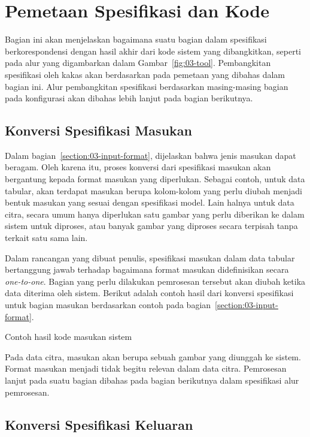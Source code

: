 \section{Pemetaan Spesifikasi dan Kode}

Bagian ini akan menjelaskan bagaimana suatu bagian dalam spesifikasi berkorespondensi dengan hasil akhir dari kode sistem yang dibangkitkan, seperti pada alur yang digambarkan dalam Gambar~\ref{fig:03-tool}.
Pembangkitan spesifikasi oleh kakas akan berdasarkan pada pemetaan yang dibahas dalam bagian ini.
Alur pembangkitan spesifikasi berdasarkan masing-masing bagian pada konfigurasi akan dibahas lebih lanjut pada bagian berikutnya.

\subsection{Konversi Spesifikasi Masukan}

Dalam bagian~\ref{section:03-input-format}, dijelaskan bahwa jenis masukan dapat beragam.
Oleh karena itu, proses konversi dari spesifikasi masukan akan bergantung kepada format masukan yang diperlukan.
Sebagai contoh, untuk data tabular, akan terdapat masukan berupa kolom-kolom yang perlu diubah menjadi bentuk masukan yang sesuai dengan spesifikasi model.
Lain halnya untuk data citra, secara umum hanya diperlukan satu gambar yang perlu diberikan ke dalam sistem untuk diproses, atau banyak gambar yang diproses secara terpisah tanpa terkait satu sama lain.

Dalam rancangan yang dibuat penulis, spesifikasi masukan dalam data tabular bertanggung jawab terhadap bagaimana format masukan didefinisikan secara \textit{one-to-one}.
Bagian yang perlu dilakukan pemrosesan tersebut akan diubah ketika data diterima oleh sistem.
Berikut adalah contoh hasil dari konversi spesifikasi untuk bagian masukan berdasarkan contoh pada bagian~\ref{section:03-input-format}.

\begin{code}
	\caption{Contoh hasil kode masukan sistem}
	\label{listing:10}
\end{code}

Pada data citra, masukan akan berupa sebuah gambar yang diunggah ke sistem.
Format masukan menjadi tidak begitu relevan dalam data citra.
Pemrosesan lanjut pada suatu bagian dibahas pada bagian berikutnya dalam spesifikasi alur pemrosesan. 

\subsection{Konversi Spesifikasi Keluaran}


